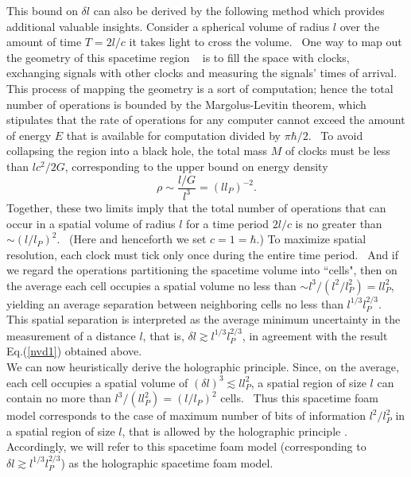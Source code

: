 \documentclass[12pt]{article}
\begin{document}
This bound on $\delta l$ can also be derived by the following method which 
provides additional valuable insights.  Consider a spherical volume of
radius $l$ over the amount of time $T = 2l/c$ it takes light to cross the
volume.  One way to map out
the geometry of this spacetime region \cite{llo04}  
is to fill the space with clocks,
exchanging signals with
other clocks and measuring the signals' times of arrival. This process of
mapping the geometry is a sort of computation; hence
the total number of operations
is bounded by the Margolus-Levitin theorem\cite{Lloyd},
which stipulates
that the rate of operations for any computer cannot exceed the amount of energy
$E$ that is available
for computation divided by $\pi \hbar/2$.  To avoid collapsing the region into
a black hole, the total mass $M$ of clocks
must be less than $l c^2 /2 G$, corresponding to the upper bound on energy density
\begin{equation}
\rho \sim \frac{l/G}{l^3} = (l l_P)^{-2}.
\label{eq:rho}
\end{equation}
Together, these two limits imply that the
total number of operations that can occur in a spatial
volume of radius $l$ for a time period $2 l/c$ is no greater than $\sim
(l/l_P)^2 $. 
(Here and henceforth we set $c=1=\hbar$.)
To maximize spatial resolution, each clock must tick only once during the entire
time period. 
And if we regard the operations partitioning the spacetime volume into ``cells",
then
on the average each cell occupies a spatial volume no less than $ \sim l^3 / (
l^2 / l_P^2) = l l_P^2 $, yielding an average
separation between neighboring cells no less than $l^{1/3} l_P^{2/3}$.  This
spatial separation is interpreted as the
average minimum uncertainty in the measurement of a distance $l$, that is,
$\delta l \gtrsim l^{1/3} l_P^{2/3}$,
in agreement with the result Eq.(\ref{nvd1}) obtained above. \\

We can now heuristically derive the holographic principle.
Since, on the average, each cell occupies
a spatial volume of $ (\delta l)^3 \lesssim l l_P^2$, a spatial region of size $l$ can 
contain no more
than $l^3/(l l_P^2) = (l/l_P)^2$ cells.  Thus this
spacetime foam model corresponds to the case of maximum number of bits of
information $l^2 /l_P^2$ in a spatial region
of size $l$, that is allowed by the holographic principle
\cite{wbhts,GPH}.  Accordingly, we will refer to this
spacetime foam model (corresponding to $\delta l \gtrsim l^{1/3} l_P^{2/3}$)
as the holographic spacetime foam model.\\
\end{document}
